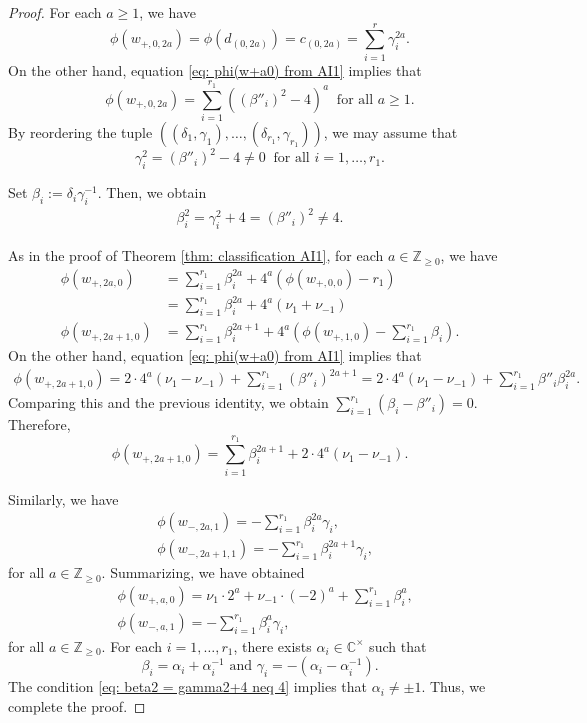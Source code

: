 \documentclass[10pt,a4paper]{amsart}
\begin{document}
\begin{proof}
  For each $a \geq 1$, we have
  \[
    \phi(w_{+,0,2a}) = \phi(d_{(0,2a)}) = c_{(0,2a)} = \sum_{i=1}^r \gamma_i^{2a}.
  \]
  On the other hand, equation \eqref{eq: phi(w+a0) from AI1} implies that
  \[
    \phi(w_{+,0,2a}) = \sum_{i=1}^{r_1} ((\beta''_i)^2-4)^a \ \text{ for all } a \geq 1.
  \]
  By reordering the tuple $((\delta_1,\gamma_1),\dots,(\delta_{r_1},\gamma_{r_1}))$, we may assume that
  \[
    \gamma_i^2 = (\beta''_i)^2-4 \neq 0 \ \text{ for all } i = 1,\dots,r_1.
  \]

  Set $\beta_i := \delta_i \gamma_i^{-1}$.
  Then, we obtain
  \begin{align}\label{eq: beta2 = gamma2+4 neq 4}
    \beta_i^2 = \gamma_i^2+4 = (\beta''_i)^2 \neq 4.
  \end{align}

  As in the proof of Theorem \ref{thm: classification AI1}, for each $a \in \mathbb{Z}_{\geq 0}$, we have
  \begin{align*}
    \phi(w_{+,2a,0}) &= \sum_{i=1}^{r_1} \beta_i^{2a} + 4^a(\phi(w_{+,0,0})-r_1) \\
    &= \sum_{i=1}^{r_1} \beta_i^{2a} + 4^a(\nu_1+\nu_{-1}) \\
    \phi(w_{+,2a+1,0}) &= \sum_{i=1}^{r_1} \beta_i^{2a+1} + 4^a(\phi(w_{+,1,0})-\sum_{i=1}^{r_1} \beta_i).
  \end{align*}
  On the other hand, equation \eqref{eq: phi(w+a0) from AI1} implies that
  \begin{align*}
    \phi(w_{+,2a+1,0}) = 2 \cdot 4^a(\nu_1 - \nu_{-1}) + \sum_{i=1}^{r_1} (\beta''_i)^{2a+1} = 2 \cdot 4^a(\nu_1 - \nu_{-1}) + \sum_{i=1}^{r_1} \beta''_i \beta_i^{2a}.
  \end{align*}
  Comparing this and the previous identity, we obtain $\sum_{i=1}^{r_1} (\beta_i-\beta''_i) = 0$.
  Therefore,
  \[
    \phi(w_{+,2a+1,0}) = \sum_{i=1}^{r_1} \beta_i^{2a+1} + 2 \cdot 4^a(\nu_1-\nu_{-1}).
  \]
  
  Similarly, we have
  \begin{align*}
    &\phi(w_{-,2a,1}) = -\sum_{i=1}^{r_1} \beta_i^{2a}\gamma_i,\\
    &\phi(w_{-,2a+1,1}) = -\sum_{i=1}^{r_1} \beta_i^{2a+1}\gamma_i,
  \end{align*}
  for all $a \in \mathbb{Z}_{\geq 0}$.
  Summarizing, we have obtained
  \begin{align*}
    &\phi(w_{+,a,0}) = \nu_1 \cdot 2^a + \nu_{-1} \cdot (-2)^a + \sum_{i=1}^{r_1} \beta_i^a,\\
    &\phi(w_{-,a,1}) = -\sum_{i=1}^{r_1} \beta_i^a \gamma_i,
  \end{align*}
  for all $a \in \mathbb{Z}_{\geq 0}$.
  For each $i = 1,\dots,r_1$, there exists $\alpha_i \in \mathbb{C}^\times$ such that
  \[
    \beta_i = \alpha_i + \alpha_i^{-1} \text{ and } \gamma_i = -(\alpha_i-\alpha_i^{-1}).
  \]
  The condition \eqref{eq: beta2 = gamma2+4 neq 4} implies that $\alpha_i \neq \pm 1$.
  Thus, we complete the proof.
\end{proof}
\end{document}
